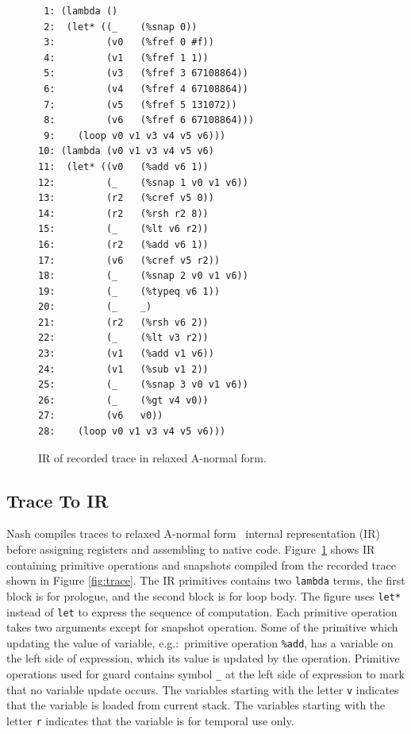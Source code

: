 \documentclass[preprint]{sigplanconf}
\begin{document}
\begin{figure}
\begin{verbatim}
 1: (lambda ()
 2:  (let* ((_    (%snap 0))
 3:         (v0   (%fref 0 #f))
 4:         (v1   (%fref 1 1))
 5:         (v3   (%fref 3 67108864))
 6:         (v4   (%fref 4 67108864))
 7:         (v5   (%fref 5 131072))
 8:         (v6   (%fref 6 67108864)))
 9:    (loop v0 v1 v3 v4 v5 v6)))
10: (lambda (v0 v1 v3 v4 v5 v6)
11:  (let* ((v0   (%add v6 1))
12:         (_    (%snap 1 v0 v1 v6))
13:         (r2   (%cref v5 0))
14:         (r2   (%rsh r2 8))
15:         (_    (%lt v6 r2))
16:         (r2   (%add v6 1))
17:         (v6   (%cref v5 r2))
18:         (_    (%snap 2 v0 v1 v6))
19:         (_    (%typeq v6 1))
20:         (_    _)
21:         (r2   (%rsh v6 2))
22:         (_    (%lt v3 r2))
23:         (v1   (%add v1 v6))
24:         (v1   (%sub v1 2))
25:         (_    (%snap 3 v0 v1 v6))
26:         (_    (%gt v4 v0))
27:         (v6   v0))
28:    (loop v0 v1 v3 v4 v5 v6)))
\end{verbatim}
\caption{IR of recorded trace in relaxed A-normal form.}
\label{fig:anf}
\end{figure}

\subsection{Trace To IR}
Nash compiles traces to relaxed A-normal form~\cite{flanagan1993essence}
internal representation (IR) before assigning registers and assembling to
native code. Figure~\hyperref[fig:anf]{\ref{fig:anf}} shows IR containing
primitive operations and snapshots compiled from the recorded trace shown in
Figure \hyperref[fig:trace]{\ref{fig:trace}}. The IR primitives contains two
\texttt{lambda} terms, the first block is for prologue, and the second block
is for loop body. The figure uses \texttt{let*} instead of \texttt{let} to
express the sequence of computation. Each primitive operation takes two
arguments except for snapshot operation. Some of the primitive which updating
the value of variable, e.g.:\ primitive operation \texttt{\%add}, has a
variable on the left side of expression, which its value is updated by the
operation. Primitive operations used for guard contains symbol \texttt{\_} at
the left side of expression to mark that no variable update occurs. The
variables starting with the letter \texttt{v} indicates that the variable is
loaded from current stack. The variables starting with the letter \texttt{r}
indicates that the variable is for temporal use only.
\end{document}
